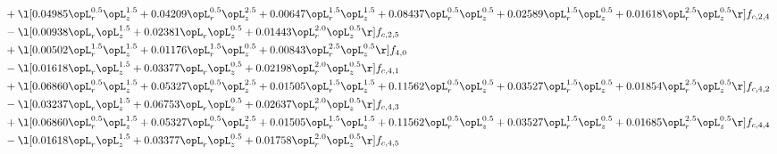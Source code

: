 \begin{alignat}{2}
& + \l[  0.04985 \opL_r^{0.5} \opL_z^{1.5} +  0.04209 \opL_r^{0.5} \opL_z^{2.5} +  0.00647 \opL_r^{1.5} \opL_z^{1.5} +  0.08437 \opL_r^{0.5} \opL_z^{0.5} +  0.02589 \opL_r^{1.5} \opL_z^{0.5} +  0.01618 \opL_r^{2.5} \opL_z^{0.5}  \r] f_{c,2,4} \nonumber \\ 
& - \l[  0.00938 \opL_r \opL_z^{1.5} +  0.02381 \opL_r \opL_z^{0.5} +  0.01443 \opL_r^{2.0} \opL_z^{0.5}  \r] f_{c,2,5} \nonumber \\ 
& + \l[  0.00502 \opL_r^{1.5} \opL_z^{1.5} +  0.01176 \opL_r^{1.5} \opL_z^{0.5} +  0.00843 \opL_r^{2.5} \opL_z^{0.5}  \r] f_{4,0} \nonumber \\ 
& - \l[  0.01618 \opL_r \opL_z^{1.5} +  0.03377 \opL_r \opL_z^{0.5} +  0.02198 \opL_r^{2.0} \opL_z^{0.5}  \r] f_{c,4,1} \nonumber \\ 
& + \l[  0.06860 \opL_r^{0.5} \opL_z^{1.5} +  0.05327 \opL_r^{0.5} \opL_z^{2.5} +  0.01505 \opL_r^{1.5} \opL_z^{1.5} +  0.11562 \opL_r^{0.5} \opL_z^{0.5} +  0.03527 \opL_r^{1.5} \opL_z^{0.5} +  0.01854 \opL_r^{2.5} \opL_z^{0.5}  \r] f_{c,4,2} \nonumber \\ 
& - \l[  0.03237 \opL_r \opL_z^{1.5} +  0.06753 \opL_r \opL_z^{0.5} +  0.02637 \opL_r^{2.0} \opL_z^{0.5}  \r] f_{c,4,3} \nonumber \\ 
& + \l[  0.06860 \opL_r^{0.5} \opL_z^{1.5} +  0.05327 \opL_r^{0.5} \opL_z^{2.5} +  0.01505 \opL_r^{1.5} \opL_z^{1.5} +  0.11562 \opL_r^{0.5} \opL_z^{0.5} +  0.03527 \opL_r^{1.5} \opL_z^{0.5} +  0.01685 \opL_r^{2.5} \opL_z^{0.5}  \r] f_{c,4,4} \nonumber \\ 
& - \l[  0.01618 \opL_r \opL_z^{1.5} +  0.03377 \opL_r \opL_z^{0.5} +  0.01758 \opL_r^{2.0} \opL_z^{0.5}  \r] f_{c,4,5} \nonumber \\ 
\end{alignat} 


